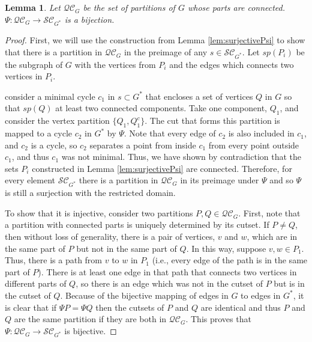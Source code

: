 \documentclass{article}
\newtheorem{lemma}{Lemma}[section]
\begin{document}
\begin{lemma}\label{lem:bijectivePsi}
    Let $\mathcal{QC}_G$ be the set of partitions of $G$ whose parts are connected. $\Psi:\mathcal{QC}_G\to\mathcal{SC}_{G^*}$ is a bijection. 
\end{lemma}
\begin{proof}
    First, we will use the construction from Lemma \ref{lem:surjectivePsi} to show that there is a partition in $\mathcal{QC}_G$ in the preimage of any $s\in \mathcal{SC}_{G^*}$. 
    Let $sp(P_i)$ be the subgraph of $G$ with the vertices from $P_i$ and the edges which connects two vertices in $P_i$.

    consider a minimal cycle $c_1$ in $s\subset G^*$ that encloses a set of vertices $Q$ in $G$ so that $sp(Q)$ at least two connected components. Take one component, $Q_1$, and consider the vertex partition $\{Q_1,Q_1^c\}$. The cut that forms this partition is mapped to a cycle $c_2$ in $G^*$ by $\Psi$. Note that every edge of $c_2$ is also included in $c_1$, and $c_2$ is a cycle, so $c_2$ separates a point from inside $c_1$ from every point outside $c_1$, and thus  $c_1$ was not minimal. Thus, we have shown by contradiction that the sets $P_i$ constructed in Lemma \ref{lem:surjectivePsi} are connected. Therefore, for every element $\mathcal{SC}_{G^*}$ there is a partition in $\mathcal{QC}_G$ in its preimage under $\Psi$ and so $\Psi$ is still a surjection with the restricted domain.

    To show that it is injective, consider two partitions $P,Q\in \mathcal{QC}_{G}$. First, note that a partition with connected parts is uniquely determined by its cutset. If $P\neq Q$, then without loss of generality, there is a pair of vertices, $v$ and $w$, which are in the same part of $P$ but not in the same part of $Q$. In this way, suppose $v,w\in P_1$. Thus, there is a path from $v$ to $w$ in $P_1$ (i.e., every edge of the path is in the same part of $P$). There is at least one edge in that path that connects two vertices in different parts of $Q$, so there is an edge which was not in the cutset of $P$ but is in the cutset of $Q$. Because of the bijective mapping of edges in $G$ to edges in $G^*$, it is clear that if $\Psi P=\Psi Q$ then the cutsets of $P$ and $Q$ are identical and thus $P$ and $Q$ are the same partition if they are both in $\mathcal{QC}_G$. This proves that $\Psi:\mathcal{QC}_{G}\to \mathcal{SC}_{G^*}$ is bijective. 
\end{proof}
\end{document}
